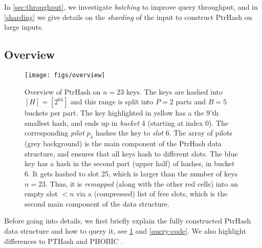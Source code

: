 \documentclass[a4paper,UKenglish,cleveref,thm-restate]{lipics-v2021}
\begin{document}
In \cref{sec:throughput}, we investigate \emph{batching} to improve query
throughput, and in \cref{sharding} we give details on the \emph{sharding} of the
input to construct PtrHash on large inputs.
\subsection{Overview}
\label{sec:orgd1d6fb1}

\begin{figure}[t]
\centering
\texttt{[image: figs/overview]}
\caption{\label{overview}Overview of PtrHash on \(n=23\) keys. The keys are
  hashed into \([H] = [2^{64}]\) and this range is split into \(P=2\) parts and
  \(B=5\) buckets per part. The key highlighted in yellow has a the 9'th
  smallest hash, and ends up in \emph{bucket} 4 (starting at index 0). The corresponding
  \emph{pilot} $p_4$ hashes the key to \emph{slot} 6.
  The array of pilots (grey background) is the main component of the PtrHash
  data structure, and ensures that all keys hash to different slots.
  The blue key has a hash in the second
  part (upper half) of hashes, in bucket 6. It gets hashed to slot 25, which is
  larger than the number of keys $n=23$. Thus, it is \emph{remapped} (along with
  the other red cells) into an
  empty slot $<n$ via a (compressed) list of free slots, which is the second
  main component of the data structure.}
\vspace{-1em}
\end{figure}

Before going into details, we first briefly explain the fully constructed
PtrHash data structure and how to query it, see \cref{overview} and \cref{query-code}. We also
highlight differences to PTHash \cite{pthash} and PHOBIC \cite{phobic}.
\end{document}
